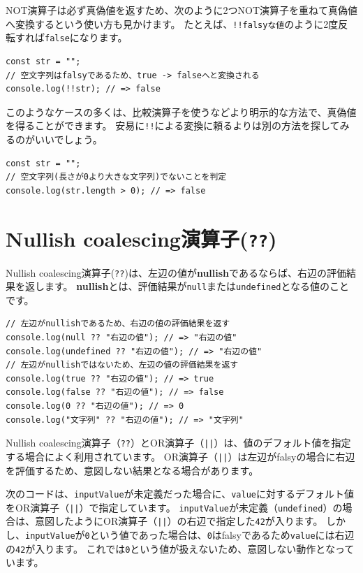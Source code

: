 NOT演算子は必ず真偽値を返すため、次のように2つNOT演算子を重ねて真偽値へ変換するという使い方も見かけます。
たとえば、\texttt{!!falsyな値}のように2度反転すれば\texttt{false}になります。

\begin{lstlisting}
const str = "";
// 空文字列はfalsyであるため、true -> falseへと変換される
console.log(!!str); // => false
\end{lstlisting}

このようなケースの多くは、比較演算子を使うなどより明示的な方法で、真偽値を得ることができます。
安易に\texttt{!!}による変換に頼るよりは別の方法を探してみるのがいいでしょう。

\begin{lstlisting}
const str = "";
// 空文字列(長さが0より大きな文字列)でないことを判定
console.log(str.length > 0); // => false
\end{lstlisting}

\hypertarget{nullish-coalescing-operator}{%
\section{Nullish coalescing演算子(\texttt{??})\,\protect{}}\label{nullish-coalescing-operator}}

Nullish coalescing演算子(\texttt{??})は、左辺の値が\textbf{nullish}であるならば、右辺の評価結果を返します。
\textbf{nullish}とは、評価結果が\texttt{null}または\texttt{undefined}となる値のことです。

\begin{lstlisting}
// 左辺がnullishであるため、右辺の値の評価結果を返す
console.log(null ?? "右辺の値"); // => "右辺の値"
console.log(undefined ?? "右辺の値"); // => "右辺の値"
// 左辺がnullishではないため、左辺の値の評価結果を返す
console.log(true ?? "右辺の値"); // => true
console.log(false ?? "右辺の値"); // => false
console.log(0 ?? "右辺の値"); // => 0
console.log("文字列" ?? "右辺の値"); // => "文字列"
\end{lstlisting}

Nullish coalescing演算子（\texttt{??}）とOR演算子（\texttt{||}）は、値のデフォルト値を指定する場合によく利用されています。
OR演算子（\texttt{||}）は左辺がfalsyの場合に右辺を評価するため、意図しない結果となる場合があります。

次のコードは、\texttt{inputValue}が未定義だった場合に、\texttt{value}に対するデフォルト値をOR演算子（\texttt{||}）で指定しています。
\texttt{inputValue}が未定義（\texttt{undefined}）の場合は、意図したようにOR演算子（\texttt{||}）の右辺で指定した\texttt{42}が入ります。
しかし、\texttt{inputValue}が\texttt{0}という値であった場合は、\texttt{0}はfalsyであるため\texttt{value}には右辺の\texttt{42}が入ります。
これでは\texttt{0}という値が扱えないため、意図しない動作となっています。

